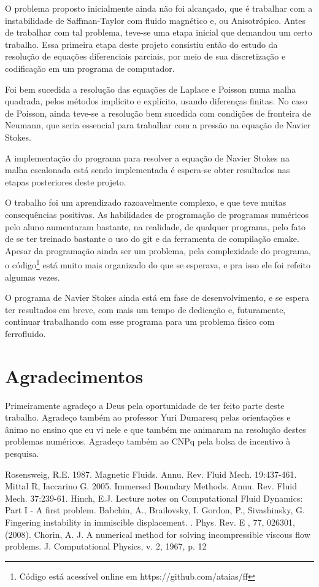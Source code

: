 \documentclass[journal]{IEEEtran}
\begin{document}
O problema proposto inicialmente ainda não foi alcançado, que é trabalhar com a instabilidade de Saffman-Taylor com fluido magnético e, ou Anisotrópico. Antes de trabalhar com tal problema, teve-se uma etapa inicial que demandou um certo trabalho. Essa primeira etapa deste projeto consistiu então do estudo da resolução de equações diferenciais parciais, por meio de sua discretização e codificação em um programa de computador.

Foi bem sucedida a resolução das equações de Laplace e Poisson numa malha quadrada, pelos métodos implícito e explícito, usando diferenças finitas. No caso de Poisson, ainda teve-se a resolução bem sucedida com condições de fronteira de Neumann, que seria essencial para trabalhar com a pressão na equação de Navier Stokes.

A implementação do programa para resolver a equação de Navier Stokes na malha escalonada está sendo implementada é espera-se obter resultados nas etapas posteriores deste projeto.

O trabalho foi um aprendizado razoavelmente complexo, e que teve muitas consequências positivas. As habilidades de programação de programas numéricos pelo aluno aumentaram bastante, na realidade, de qualquer programa, pelo fato de se ter treinado bastante o uso do git e da ferramenta de compilação cmake. Apesar da programação ainda ser um problema, pela complexidade do programa, o código\footnote{Código está acessível online em https://github.com/ataias/ff} está muito mais organizado do que se esperava, e pra isso ele foi refeito algumas vezes.

O programa de Navier Stokes ainda está em fase de desenvolvimento, e se espera ter resultados em breve, com mais um tempo de dedicação e, futuramente, continuar trabalhando com esse programa para um problema físico com ferrofluido.

\section*{Agradecimentos}

Primeiramente agradeço a Deus pela oportunidade de ter feito parte deste trabalho. Agradeço também ao professor Yuri Dumaresq pelas orientações e ânimo no ensino que eu vi nele e que também me animaram na resolução destes problemas numéricos. Agradeço também ao CNPq pela bolsa de incentivo à pesquisa.

\begin{thebibliography}{4}
 Rosensweig, R.E. 1987. Magnetic Fluids. Annu. Rev. Fluid Mech. 19:437-461.
 Mittal R, Iaccarino G. 2005. Immersed Boundary Methods. Annu. Rev. Fluid Mech. 37:239-61.
 Hinch, E.J. Lecture notes on Computational Fluid Dynamics: Part I - A first problem. 
 Babchin, A., Brailovsky, I. Gordon, P., Sivashinsky, G. Fingering instability in immiscible displacement. . Phys. Rev. E , 77, 026301, (2008).
 Chorin, A. J. A numerical method for solving incompressible viscous flow problems. J. Computational Physics, v. 2, 1967, p. 12
\end{thebibliography}
\end{document}
